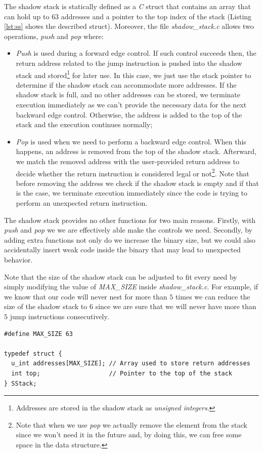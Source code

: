 The shadow stack is statically defined as a \textit{C} struct that contains an array
that can hold up to $63$ addresses and a pointer to the top index of the stack (Listing
\ref{lst:ss} shows the described struct). Moreover, the file \textit{shadow\_stack.c}
allows two operations, \textit{push} and \textit{pop} where:
\begin{itemize}
  \item \textit{Push} is used during a forward edge control. If such control succeeds
    then, the return address related to the jump instruction is pushed into the
    shadow stack and stored\footnote{Addresses are stored in the shadow stack as
    \textit{unsigned integers}.} for later use. In this case, we just use the stack
    pointer to determine if the shadow stack can accommodate more addresses. If
    the shadow stack is full, and no other addresses can be stored, we terminate
    execution immediately as we can't provide the necessary data for the next
    backward edge control. Otherwise, the address is added to the top of the
    stack and the execution continues normally;

  \item \textit{Pop} is used when we need to perform a backward edge control. When
    this happens, an address is removed from the top of the shadow stack. Afterward,
    we match the removed address with the user-provided return address to decide
    whether the return instruction is considered legal or not\footnote{Note that
    when we use \textit{pop} we actually remove the element from the stack since
    we won't need it in the future and, by doing this, we can free some space in
    the data structure.}. Note that before removing the address we check if the
    shadow stack is empty and if that is the case, we terminate execution immediately
    since the code is trying to perform an unexpected return instruction.
\end{itemize}

The shadow stack provides no other functions for two main reasons. Firstly, with
\textit{push} and \textit{pop} we we are effectively able make the controls we need.
Secondly, by adding extra functions not only do we increase the binary size, but
we could also accidentally insert weak code inside the binary that may lead to
unexpected behavior.

Note that the size of the shadow stack can be adjusted to fit every need by
simply modifying the value of \textit{MAX\_SIZE} inside \textit{shadow\_stack.c}.
For example, if we know that our code will never nest for more than $5$ times we
can reduce the size of the shadow stack to $6$ since we are sure that we will
never have more than $5$ jump instructions consecutively. \\ \begin{lstlisting}[style=CStyle, caption = shadow stack definition inside \textit{shadow\_stack.c}, label={lst:ss}]
#define MAX_SIZE 63

typedef struct {
  u_int addresses[MAX_SIZE]; // Array used to store return addresses
  int top;                   // Pointer to the top of the stack
} SStack;
\end{lstlisting}

